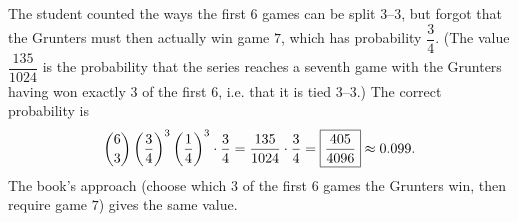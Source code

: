 The student counted the ways the first $6$ games can be split $3$--$3$, but forgot that the Grunters must then actually win game $7$, which has probability $\dfrac{3}{4}$. (The value $\dfrac{135}{1024}$ is the probability that the series reaches a seventh game with the Grunters having won exactly $3$ of the first $6$, i.e. that it is tied $3$--$3$.) The correct probability is
\[\dbinom63\left(\dfrac{3}{4}\right)^3\left(\dfrac{1}{4}\right)^3\cdot\dfrac{3}{4}=\dfrac{135}{1024}\cdot\dfrac{3}{4}=\boxed{\dfrac{405}{4096}}\approx0.099.\]
The book's approach (choose which $3$ of the first $6$ games the Grunters win, then require game $7$) gives the same value.
